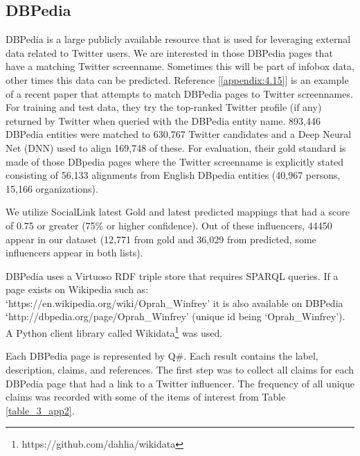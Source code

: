 \subsection{DBPedia}

\iffalse
\begin{figure}[htbp]
\centerline{\texttt{[image: Fig11.png]}}
\caption[DBPedia Data]{Example of additional data brought via DBPedia.}
\label{fig_ch7_6}
\end{figure}
\fi

DBPedia is a large publicly available resource that is used for leveraging external data related to Twitter users. We are interested in those DBPedia pages that have a matching Twitter screenname. Sometimes this will be part of infobox data, other times this data can be predicted. Reference [\ref{appendix:4.15}] is an example of a recent paper that attempts to match DBPedia pages to Twitter screennames. For training and test data, they try the top-ranked Twitter proﬁle (if any) returned by Twitter when queried with the DBPedia entity name. 893,446 DBPedia entities were matched to 630,767 Twitter candidates and a Deep Neural Net (DNN) used to align 169,748 of these. For evaluation, their gold standard is made of those DBpedia pages where the Twitter screenname is explicitly stated consisting of 56,133 alignments from English DBpedia entities (40,967 persons, 15,166 organizations). 

We utilize SocialLink latest Gold and latest predicted mappings that had a score of 0.75 or greater (75\% or higher confidence). Out of these influencers, 44450 appear in our dataset (12,771 from gold and 36,029 from predicted, some influencers appear in both lists).

DBPedia uses a Virtuoso RDF triple store that requires SPARQL queries. If a page exists on Wikipedia such as: `https://en.wikipedia.org/wiki/Oprah{\_}Winfrey' it is also available on DBPedia `http://dbpedia.org/page/Oprah{\_}Winfrey' (unique id being `Oprah{\_}Winfrey'). A Python client library called Wikidata\footnote{https://github.com/dahlia/wikidata} was used.

Each DBPedia page is represented by Q{\#}. Each result contains the label, description, claims, and references. The first step was to collect all claims for each DBPedia page that had a link to a Twitter influencer. The frequency of all unique claims was recorded with some of the items of interest from Table \ref{table_3_app2}. 

